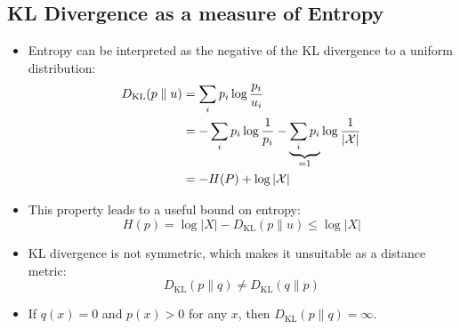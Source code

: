\subsection{KL Divergence as a measure of Entropy}
\begin{itemize}
    \item Entropy can be interpreted as the negative of the KL divergence to a uniform distribution:
          \begin{align}
              D_{\text{KL}}(p \parallel u) & = \sum_i p_i \log \frac{p_i}{u_i} \notag                                                            \\
                                           & = -\sum_i p_i \log \frac{1}{p_i} - \underbrace{\sum_i p_i}_{=1} \log \frac{1}{|\mathcal{X}|} \notag \\
                                           & = -H(P) + \log |\mathcal{X}|
          \end{align}
    \item This property leads to a useful bound on entropy:
          \[
              H(p) = \log |X| - D_{\text{KL}}(p \parallel u) \leq \log |X|
          \]
    \item KL divergence is not symmetric, which makes it unsuitable as a distance metric:
          \[
              D_{\text{KL}}(p \parallel q) \neq D_{\text{KL}}(q \parallel p)
          \]
    \item If \( q(x) = 0 \) and \( p(x) > 0 \) for any \( x \), then \( D_{\text{KL}}(p \parallel q) = \infty \).
\end{itemize}



